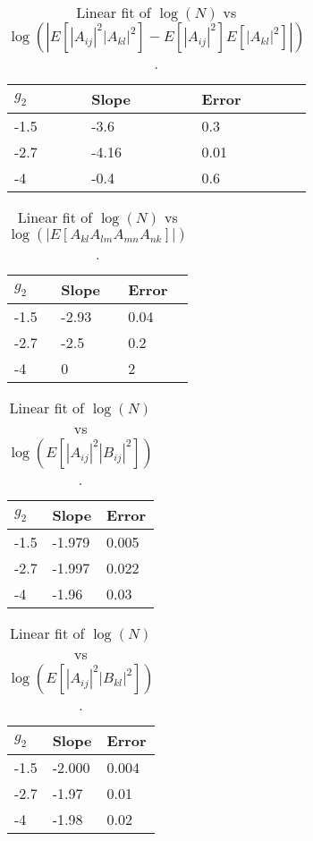 \documentclass[12pt,a4paper]{article}
\begin{document}
\begin{table}[hp]
\centering
\begin{tabular}{|l|l|l|}
\hline
$g_2$ & Slope & Error \\ \hline
-1.5 & -3.6 & 0.3 \\ \hline
-2.7 & -4.16 & 0.01 \\ \hline
-4 & -0.4 & 0.6 \\ \hline
\end{tabular}
\caption{Linear fit of $\log(N)$ vs $\log(|E[ |A_{ij}|^2  |A_{kl}|^2 ] - E[ |A_{ij}|^2 ] E[ |A_{kl}|^2 ]|)$.}
\label{tab:NAstatind}
\end{table}
\begin{table}[hp]
\centering
\begin{tabular}{|l|l|l|}
\hline
$g_2$ & Slope & Error \\ \hline
-1.5 & -2.93 & 0.04 \\ \hline
-2.7 & -2.5 & 0.2 \\ \hline
-4 & 0 & 2 \\ \hline
\end{tabular}
\caption{Linear fit of $\log(N)$ vs $\log(|E[ A_{kl} A_{lm} A_{mn} A_{nk} ]|)$.}
\label{tab:N4Aexp}
\end{table}
\begin{table}[hp]
\centering
\begin{tabular}{|l|l|l|}
\hline
$g_2$ & Slope & Error \\ \hline
-1.5 & -1.979 & 0.005 \\ \hline
-2.7 & -1.997 & 0.022 \\ \hline
-4 & -1.96 & 0.03 \\ \hline
\end{tabular}
\caption{Linear fit of $\log(N)$ vs $\log(E[ |A_{ij}|^2  |B_{ij}|^2   ])$.}
\label{tab:NABijij}
\end{table}
\begin{table}[hp]
\centering
\begin{tabular}{|l|l|l|}
\hline
$g_2$ & Slope & Error \\ \hline
-1.5 & -2.000 & 0.004 \\ \hline
-2.7 & -1.97 & 0.01 \\ \hline
-4 & -1.98 & 0.02 \\ \hline
\end{tabular}
\caption{Linear fit of $\log(N)$ vs $\log(E[ |A_{ij}|^2  |B_{kl}|^2   ])$.}
\label{tab:NABijkl}
\end{table}
\end{document}
